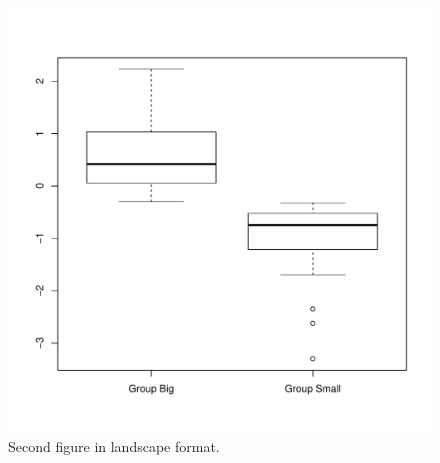 \documentclass[11pt,a4paper]{article}
\newcommand{\blandscape}{\begin{landscape}}
\newcommand{\elandscape}{\end{landscape}}
\begin{document}
\newpage

\blandscape

\begin{figure}
\centering
\includegraphics{figures/Fig2-1.pdf}
\caption{Second figure in landscape format.}
\end{figure}

\elandscape

\clearpage
\end{document}
